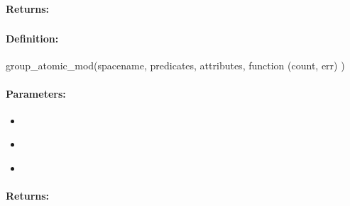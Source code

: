 \paragraph{Returns:}


\pagebreak
\subsubsection{}
\label{api:nodejs:group_atomic_mod}


\paragraph{Definition:}
\begin{javascriptcode}
group_atomic_mod(spacename, predicates, attributes, function (count, err) {})
\end{javascriptcode}
\paragraph{Parameters:}
\begin{itemize}[noitemsep]
\item {}\\

\item {}\\

\item {}\\

\end{itemize}

\paragraph{Returns:}


\pagebreak
\subsubsection{}
\label{api:nodejs:atomic_mod}


